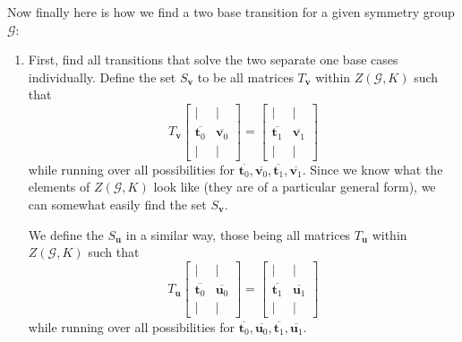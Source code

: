 \documentclass[a4paper,10pt]{article}
\theoremstyle{plain}
\theoremstyle{definition}
\theoremstyle{remark}
\renewcommand{\vec}[1]{\textbf{#1}}
\begin{document}
Now finally here is how we find a two base transition for a given symmetry group \(\mathcal{G}\):
\begin{enumerate}
    \item First, find all transitions that solve the two separate one base cases individually.
        Define the set \(S_\vec{v}\) to be all matrices \(T_\vec{v}\) within \(Z(\mathcal{G}, K)\) such that \[T_\vec{v}\begin{bmatrix}
            | & | \\
            \overline{\vec{t}_0} & \overline{\vec{v}_0} \\
            | & |
        \end{bmatrix} = \begin{bmatrix}
            | & | \\
            \overline{\vec{t}_1} & \overline{\vec{v}_1} \\
            | & |
        \end{bmatrix}\] while running over all possibilities for \(\overline{\vec{t}_0}, \overline{\vec{v}_0}, \overline{\vec{t}_1}, \overline{\vec{v}_1}\).
        Since we know what the elements of \(Z(\mathcal{G}, K)\) look like (they are of a particular general form), we can somewhat easily find the set \(S_\vec{v}\).

        We define the \(S_\vec{u}\) in a similar way, those being all matrices \(T_\vec{u}\) within \(Z(\mathcal{G}, K)\) such that 
        \[T_\vec{u}\begin{bmatrix}
            | & | \\
            \overline{\vec{t}_0} & \overline{\vec{u}_0} \\
            | & |
        \end{bmatrix} = \begin{bmatrix}
            | & | \\
            \overline{\vec{t}_1} & \overline{\vec{u}_1} \\
            | & |
        \end{bmatrix}\] while running over all possibilities for \(\overline{\vec{t}_0}, \overline{\vec{u}_0}, \overline{\vec{t}_1}, \overline{\vec{u}_1}\).


\end{enumerate}
\end{document}
